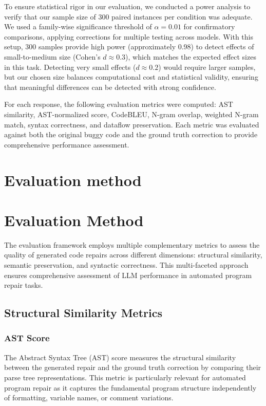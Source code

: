
To ensure statistical rigor in our evaluation, we conducted a power analysis to verify that our sample size of 300 paired instances per condition was adequate. We used a family-wise significance threshold of $\alpha = 0.01$ for confirmatory comparisons, applying corrections for multiple testing across models. With this setup, 300 samples provide high power (approximately 0.98) to detect effects of small-to-medium size (Cohen's $d \approx 0.3$), which matches the expected effect sizes in this task. Detecting very small effects ($d \approx 0.2$) would require larger samples, but our chosen size balances computational cost and statistical validity, ensuring that meaningful differences can be detected with strong confidence.

For each response, the following evaluation metrics were computed: AST similarity, AST-normalized score, CodeBLEU, N-gram overlap, weighted N-gram match, syntax correctness, and dataflow preservation. Each metric was evaluated against both the original buggy code and the ground truth correction to provide comprehensive performance assessment.

\section{Evaluation method}

\section{Evaluation Method}
\label{sec:evaluation-method}

The evaluation framework employs multiple complementary metrics to assess the quality of generated code repairs across different dimensions: structural similarity, semantic preservation, and syntactic correctness. This multi-faceted approach ensures comprehensive assessment of LLM performance in automated program repair tasks.

\subsection{Structural Similarity Metrics}

\subsubsection{AST Score}
The Abstract Syntax Tree (AST) score measures the structural similarity between the generated repair and the ground truth correction by comparing their parse tree representations. This metric is particularly relevant for automated program repair as it captures the fundamental program structure independently of formatting, variable names, or comment variations.

